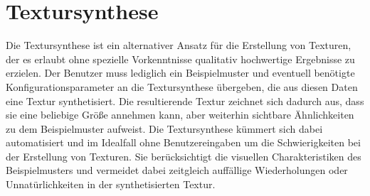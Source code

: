 \section{Textursynthese}

Die Textursynthese ist ein alternativer Ansatz für die Erstellung von Texturen, der es erlaubt ohne spezielle Vorkenntnisse qualitativ hochwertige Ergebnisse zu erzielen.
Der Benutzer muss lediglich ein Beispielmuster und eventuell benötigte Konfigurationsparameter an die Textursynthese übergeben, die aus diesen Daten eine Textur synthetisiert.
Die resultierende Textur zeichnet sich dadurch aus, dass sie eine beliebige Größe annehmen kann, aber weiterhin sichtbare Ähnlichkeiten zu dem Beispielmuster aufweist.
Die Textursynthese kümmert sich dabei automatisiert und im Idealfall ohne Benutzereingaben um die Schwierigkeiten bei der Erstellung von Texturen.
Sie berücksichtigt die visuellen Charakteristiken des Beispielmusters und vermeidet dabei zeitgleich auffällige Wiederholungen oder Unnatürlichkeiten in der synthetisierten Textur.
